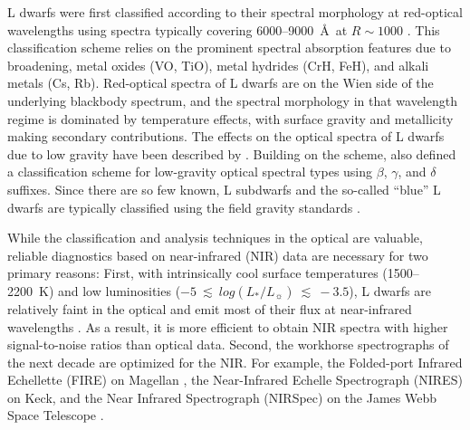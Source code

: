 \documentclass[12pt]{aastex6}
\begin{document}
L dwarfs were first classified according to their spectral morphology at red-optical wavelengths using spectra typically covering 6000--9000~\AA~at $R\sim1000$ \citep{Martin99,K99,Kirkpatrick05}.
This classification scheme relies on the prominent spectral absorption features due to  broadening, metal oxides (VO, TiO), metal hydrides (CrH, FeH), and alkali metals (Cs, Rb).
Red-optical spectra of L dwarfs are on the Wien side of the underlying blackbody spectrum, and the spectral morphology in that wavelength regime is dominated by temperature effects, with surface gravity and metallicity making secondary contributions.
The effects on the optical spectra of L dwarfs due to low gravity have been described by \citet{Martin99,Kirkpatrick06,Kirkpatrick08, Cruz09_lowg,Luhman09_taurus}.
Building on the \citet{K99} scheme, \citet{Cruz09_lowg} also defined a classification scheme for low-gravity optical spectral types using $\beta$, $\gamma$, and $\delta$ suffixes.
Since there are so few known, L subdwarfs and the so-called ``blue'' L dwarfs are typically  classified using the field gravity standards \citep{Gizis:2006jl,Burgasser07_subdwarfs, Burgasser08_blue, Kirkpatrick10, Kirkpatrick:2014kv}.

While the classification and analysis techniques in the optical are valuable, reliable diagnostics based on near-infrared (NIR) data are necessary for two primary reasons:
First, with intrinsically cool surface temperatures (1500--2200~K) and low luminosities ($-5~\lesssim~log(L_*/L_\sun)~\lesssim~-3.5$), L dwarfs are relatively faint in the optical and emit most of their flux at near-infrared wavelengths \citep[e.g.,][]{Filippazzo:2015dv}.
As a result, it is more efficient to obtain NIR spectra with higher signal-to-noise ratios than optical data.
Second, the workhorse spectrographs of the next decade are optimized for the NIR. For example, the Folded-port Infrared Echellette (FIRE) on Magellan \citep{Simcoe:2013kh}, the Near-Infrared Echelle Spectrograph (NIRES) on Keck, and the Near Infrared Spectrograph (NIRSpec) on the James Webb Space Telescope \citep{Ferruit:2012em}.
\end{document}
